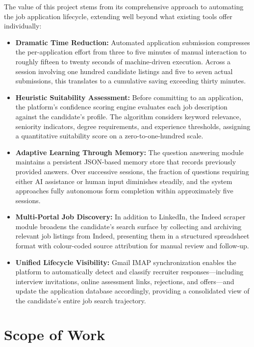 \documentclass[12pt, a4paper, oneside]{report}
\begin{document}
The value of this project stems from its comprehensive approach to automating the job application lifecycle, extending well beyond what existing tools offer individually:

\begin{itemize}
    \item \textbf{Dramatic Time Reduction:} Automated application submission compresses the per-application effort from three to five minutes of manual interaction to roughly fifteen to twenty seconds of machine-driven execution. Across a session involving one hundred candidate listings and five to seven actual submissions, this translates to a cumulative saving exceeding thirty minutes.
    \item \textbf{Heuristic Suitability Assessment:} Before committing to an application, the platform's confidence scoring engine evaluates each job description against the candidate's profile. The algorithm considers keyword relevance, seniority indicators, degree requirements, and experience thresholds, assigning a quantitative suitability score on a zero-to-one-hundred scale.
    \item \textbf{Adaptive Learning Through Memory:} The question answering module maintains a persistent JSON-based memory store that records previously provided answers. Over successive sessions, the fraction of questions requiring either AI assistance or human input diminishes steadily, and the system approaches fully autonomous form completion within approximately five sessions.
    \item \textbf{Multi-Portal Job Discovery:} In addition to LinkedIn, the Indeed scraper module broadens the candidate's search surface by collecting and archiving relevant job listings from Indeed, presenting them in a structured spreadsheet format with colour-coded source attribution for manual review and follow-up.
    \item \textbf{Unified Lifecycle Visibility:} Gmail IMAP synchronization enables the platform to automatically detect and classify recruiter responses---including interview invitations, online assessment links, rejections, and offers---and update the application database accordingly, providing a consolidated view of the candidate's entire job search trajectory.
\end{itemize}

\section{Scope of Work}
\label{sec:scope}
\end{document}
